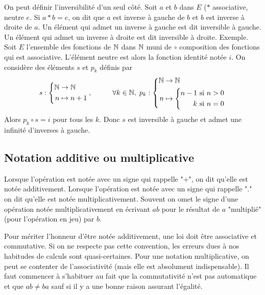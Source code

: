 \begin{rem}
 On peut définir l'inversibilité d'un seul côté. Soit $a$ et $b$ dans $E$ ($*$ associative, neutre $e$. Si $a * b = e$, on dit que $a$ est inverse à gauche de $b$ et $b$ est inverse à droite de $a$. Un élément qui admet un inverse à gauche est dit inversible à gauche. Un élément qui admet un inverse à droite est dit inversible à droite.\newline
 Exemple. Soit $E$ l'ensemble des fonctions de $\mathbb{N}$ dans $\mathbb{N}$ muni de $\circ$ composition des fonctions qui est associative. L'élément neutre est alors la fonction identité notée $i$. On considère des éléments $s$ et $p_k$ définis par
\[
 s: 
\left\lbrace 
  \begin{aligned}
    \mathbb{N} &\rightarrow \mathbb{N} \\ n &\mapsto n+1
  \end{aligned}
\right. , \hspace{1cm}
\forall k \in \mathbb{N},\; p_k :
\left\lbrace 
  \begin{aligned}
    \mathbb{N} &\rightarrow \mathbb{N} \\ 
    n &\mapsto 
      \left\lbrace  
        \begin{aligned}
          n-1 &\text{ si } n > 0 \\
          k &\text{ si } n = 0 
         \end{aligned}
       \right. 
  \end{aligned}
\right.
\]
Alors $p_k \circ s = i$ pour tous les $k$. Donc $s$ est inversible à gauche et admet une infinité d'inverses à gauche. 
\end{rem}


\subsection{Notation additive ou multiplicative}
 Lorsque l'opération est notée avec un signe qui rappelle "+", on dit qu'elle est notée additivement. Lorsque l'opération est notée avec un signe qui rappelle "." on dit qu'elle est notée multiplicativement. Souvent on omet le signe d'une opération notée multiplicativement en écrivant $ab$ pour le résultat de $a$ "multiplié" (pour l'opération en jeu) par $b$.
\begin{rem}
Pour mériter l'honneur d'être notée additivement, une loi doit être associative et commutative. Si on ne respecte pas cette convention, les erreurs dues à nos habitudes de calculs sont quasi-certaines.\newline
Pour une notation multiplicative, on peut se contenter de l'associativité (mais elle est absolument indispensable). Il faut commencer à s'habituer au fait que la commutativité n'est pas automatique et que $ab \neq ba$ sauf si il y a une bonne raison assurant l'égalité.  
\end{rem}

